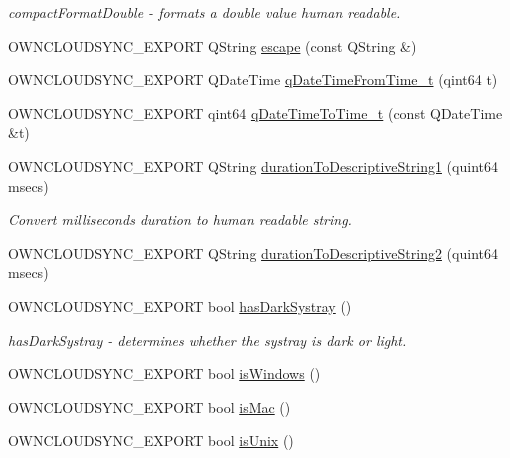\begin{DoxyCompactItemize}
\begin{DoxyCompactList}\small\item\em compact\+Format\+Double -\/ formats a double value human readable. \end{DoxyCompactList}\item 
O\+W\+N\+C\+L\+O\+U\+D\+S\+Y\+N\+C\+\_\+\+E\+X\+P\+O\+RT Q\+String \hyperlink{namespace_o_c_c_1_1_utility_ad74fc97794d5c89900c6ecb1c59d96cb}{escape} (const Q\+String \&)
\item 
O\+W\+N\+C\+L\+O\+U\+D\+S\+Y\+N\+C\+\_\+\+E\+X\+P\+O\+RT Q\+Date\+Time \hyperlink{namespace_o_c_c_1_1_utility_ae1f64aa75b5c3214e140c84b83d7da45}{q\+Date\+Time\+From\+Time\+\_\+t} (qint64 t)
\item 
O\+W\+N\+C\+L\+O\+U\+D\+S\+Y\+N\+C\+\_\+\+E\+X\+P\+O\+RT qint64 \hyperlink{namespace_o_c_c_1_1_utility_a28fbfd6b74659e670ebab0c6b955d4b0}{q\+Date\+Time\+To\+Time\+\_\+t} (const Q\+Date\+Time \&t)
\item 
O\+W\+N\+C\+L\+O\+U\+D\+S\+Y\+N\+C\+\_\+\+E\+X\+P\+O\+RT Q\+String \hyperlink{namespace_o_c_c_1_1_utility_adda2449d3e0697cd65366b2e0c2ab4d4}{duration\+To\+Descriptive\+String1} (quint64 msecs)
\begin{DoxyCompactList}\small\item\em Convert milliseconds duration to human readable string. \end{DoxyCompactList}\item 
O\+W\+N\+C\+L\+O\+U\+D\+S\+Y\+N\+C\+\_\+\+E\+X\+P\+O\+RT Q\+String \hyperlink{namespace_o_c_c_1_1_utility_a6ce540b22225886d8598b42d01358edb}{duration\+To\+Descriptive\+String2} (quint64 msecs)
\item 
O\+W\+N\+C\+L\+O\+U\+D\+S\+Y\+N\+C\+\_\+\+E\+X\+P\+O\+RT bool \hyperlink{namespace_o_c_c_1_1_utility_a56e1ad347247954a1cadec8c17ea412d}{has\+Dark\+Systray} ()
\begin{DoxyCompactList}\small\item\em has\+Dark\+Systray -\/ determines whether the systray is dark or light. \end{DoxyCompactList}\item 
O\+W\+N\+C\+L\+O\+U\+D\+S\+Y\+N\+C\+\_\+\+E\+X\+P\+O\+RT bool \hyperlink{namespace_o_c_c_1_1_utility_ac7e88241e296a0e17d9e49ab1eff78d9}{is\+Windows} ()
\item 
O\+W\+N\+C\+L\+O\+U\+D\+S\+Y\+N\+C\+\_\+\+E\+X\+P\+O\+RT bool \hyperlink{namespace_o_c_c_1_1_utility_aa51a4651f7e6560f028061f65aeb694b}{is\+Mac} ()
\item 
O\+W\+N\+C\+L\+O\+U\+D\+S\+Y\+N\+C\+\_\+\+E\+X\+P\+O\+RT bool \hyperlink{namespace_o_c_c_1_1_utility_a694df7846351c718fd8ff5caf943fda8}{is\+Unix} ()

\end{DoxyCompactItemize}
